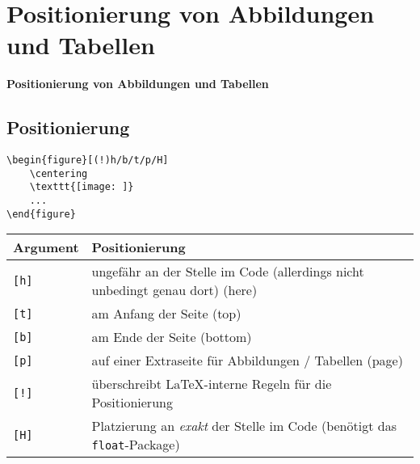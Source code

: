 \documentclass["WS\space 16-17\space -\space LaTeX-Kurs\space -\space Praesentation\space -\space 2.tex"]{subfiles}
\begin{document}
\section{Positionierung von Abbildungen und Tabellen}
\begin{frame}[c]
	\begin{center}
		\LARGE \textbf{Positionierung von Abbildungen und Tabellen}
	\end{center}
\end{frame}
\subsection*{Positionierung}
\begin{frame}[fragile]
	\begin{lstlisting}
\begin{figure}[(!)h/b/t/p/H]
	\centering
	\texttt{[image: ]}
	...
\end{figure}
	\end{lstlisting}
	
	\btVFill\Befehle
	\begin{center}
		\begin{tabular}{l p{6cm} }
			\toprule
			Argument		&	Positionierung																			\\ \midrule
			\lstinline|[h]|	&	ungefähr an der Stelle im Code (allerdings nicht unbedingt genau dort) (here)			\\
			\lstinline|[t]|	&	am Anfang der Seite (top)																\\
			\lstinline|[b]|	&	am Ende der Seite (bottom)																\\
			\lstinline|[p]|	&	auf einer Extraseite für Abbildungen / Tabellen (page)									\\
			\lstinline|[!]|	&	überschreibt \LaTeX-interne Regeln für die Positionierung								\\
			\lstinline|[H]|	&	Platzierung an \emph{exakt} der Stelle im Code (benötigt das \texttt{float}-Package)	\\
			\bottomrule
		\end{tabular}
	\end{center}
	\vspace{0.1cm}
\end{frame}
\end{document}
